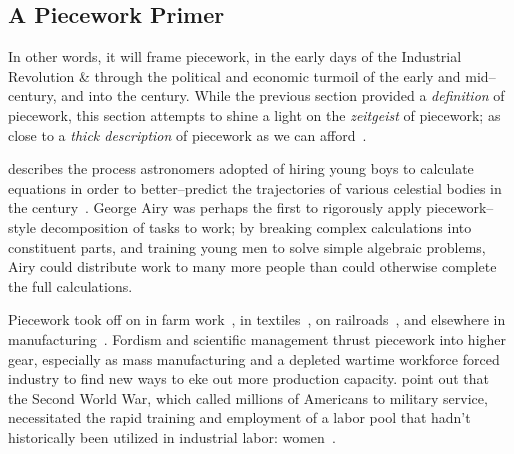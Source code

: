\documentclass[trackingWork]{subfiles}
\begin{document}
\subsection{A Piecework Primer}\label{sec:pieceworkPrimer} %
In other words, it will frame piecework,
in the early days of the Industrial Revolution \&
through the political and economic turmoil of the early and mid-- century,
and into the  century.
While the previous section provided a \textit{definition} of piecework,
this section attempts to shine a light on the \textit{zeitgeist} of piecework;
as close to a \textit{thick description} of piecework
as we can afford~\cite{geertz1973interpretation}.


\citeauthor{grier2013computers} describes the process astronomers adopted of hiring young boys
to calculate equations in order
to better--predict the trajectories of various celestial bodies in the  century~\cite{grier2013computers}.
George Airy was perhaps the first to rigorously apply piecework--style decomposition of tasks to work;
by breaking complex calculations into constituent parts, and
training young men to solve simple algebraic problems,
Airy could distribute work to many more people than could otherwise complete the full calculations.


Piecework took off on in farm work~\cite{hughRaynbirdTaskWork},
in textiles~\cite{restructuringPieceworkBaker,riisOtherSideLives},
on railroads~\cite{Brown01041990}, and 
elsewhere in manufacturing~\cite{10.2307/3827491}.
Fordism and scientific management thrust piecework into higher gear, especially as
mass manufacturing and
a depleted wartime workforce forced industry to find new ways to eke out more production capacity.
\citeauthor{hart2013rise} point out that the Second World War,
which called millions of Americans to military service,
necessitated the rapid training and employment of
a labor pool that hadn't historically been utilized in industrial labor: women~\cite{hart2013rise}.
\end{document}
